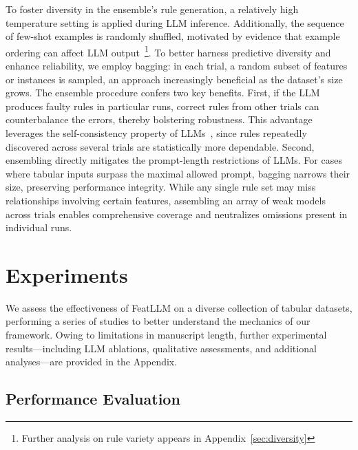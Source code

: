 To foster diversity in the ensemble's rule generation, a relatively high temperature setting is applied during LLM inference. Additionally, the sequence of few-shot examples is randomly shuffled, motivated by evidence that example ordering can affect LLM output~\cite{lu2022fantastically}\footnote{Further analysis on rule variety appears in Appendix~\ref{sec:diversity}}. To better harness predictive diversity and enhance reliability, we employ bagging: in each trial, a random subset of features or instances is sampled, an approach increasingly beneficial as the dataset's size grows. The ensemble procedure confers two key benefits. First, if the LLM produces faulty rules in particular runs, correct rules from other trials can counterbalance the errors, thereby bolstering robustness. This advantage leverages the self-consistency property of LLMs~\cite{wang2022self}, since rules repeatedly discovered across several trials are statistically more dependable. Second, ensembling directly mitigates the prompt-length restrictions of LLMs. For cases where tabular inputs surpass the maximal allowed prompt, bagging narrows their size, preserving performance integrity. While any single rule set may miss relationships involving certain features, assembling an array of weak models across trials enables comprehensive coverage and neutralizes omissions present in individual runs.

\section{Experiments}
We assess the effectiveness of \textsf{FeatLLM} on a diverse collection of tabular datasets, performing a series of studies to better understand the mechanics of our framework. Owing to limitations in manuscript length, further experimental results—including LLM ablations, qualitative assessments, and additional analyses—are provided in the Appendix.

\subsection{Performance Evaluation}
